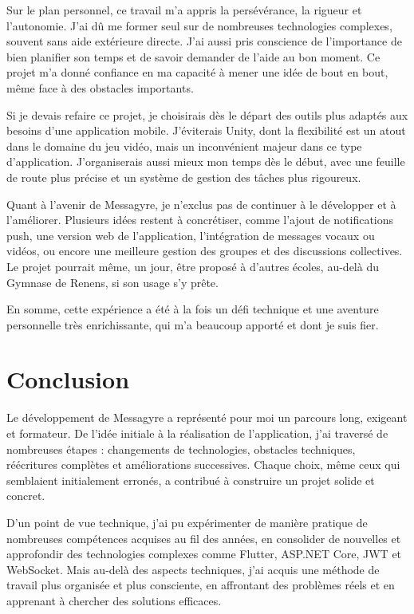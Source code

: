 \documentclass[12pt]{report}
\begin{document}
Sur le plan personnel, ce travail m’a appris la persévérance, la rigueur et l’autonomie. J’ai dû me former seul sur de nombreuses technologies complexes, souvent sans aide extérieure directe. J’ai aussi pris conscience de l’importance de bien planifier son temps et de savoir demander de l’aide au bon moment. Ce projet m’a donné confiance en ma capacité à mener une idée de bout en bout, même face à des obstacles importants.

Si je devais refaire ce projet, je choisirais dès le départ des outils plus adaptés aux besoins d’une application mobile. J’éviterais Unity, dont la flexibilité est un atout dans le domaine du jeu vidéo, mais un inconvénient majeur dans ce type d’application. J’organiserais aussi mieux mon temps dès le début, avec une feuille de route plus précise et un système de gestion des tâches plus rigoureux.

Quant à l’avenir de Messagyre, je n’exclus pas de continuer à le développer et à l’améliorer. Plusieurs idées restent à concrétiser, comme l’ajout de notifications push, une version web de l’application, l’intégration de messages vocaux ou vidéos, ou encore une meilleure gestion des groupes et des discussions collectives. Le projet pourrait même, un jour, être proposé à d’autres écoles, au-delà du Gymnase de Renens, si son usage s’y prête.

En somme, cette expérience a été à la fois un défi technique et une aventure personnelle très enrichissante, qui m’a beaucoup apporté et dont je suis fier.


\chapter{Conclusion}

Le développement de Messagyre a représenté pour moi un parcours long, exigeant et formateur. De l’idée initiale à la réalisation de l’application, j’ai traversé de nombreuses étapes : changements de technologies, obstacles techniques, réécritures complètes et améliorations successives. Chaque choix, même ceux qui semblaient initialement erronés, a contribué à construire un projet solide et concret.

D’un point de vue technique, j’ai pu expérimenter de manière pratique de nombreuses compétences acquises au fil des années, en consolider de nouvelles et approfondir des technologies complexes comme Flutter, ASP.NET Core, JWT et WebSocket. Mais au-delà des aspects techniques, j’ai acquis une méthode de travail plus organisée et plus consciente, en affrontant des problèmes réels et en apprenant à chercher des solutions efficaces.
\end{document}
